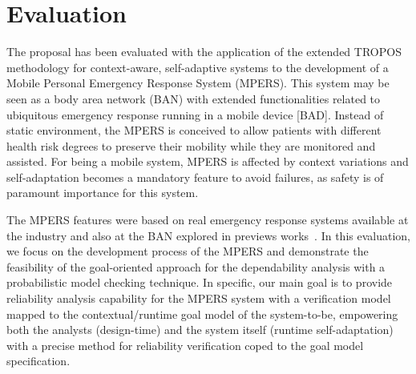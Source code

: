 


\section{Evaluation}

The proposal has been evaluated with the application of the extended TROPOS methodology for context-aware, self-adaptive systems to the development of a Mobile Personal Emergency Response System (MPERS). This system may be seen as a body area network (BAN) with extended functionalities related to ubiquitous emergency response running in a mobile device [BAD]. Instead of static environment, the MPERS is conceived to allow patients with different health risk degrees to preserve their mobility while they are monitored and assisted. For being a mobile system, MPERS is affected by context variations and self-adaptation becomes a mandatory feature to avoid failures, as safety is of paramount importance for this system.

The MPERS features were based on real emergency response systems available at the industry and also at the BAN explored in previews works~\cite{Lorincz2004, Nunes:2012, MPERS:GoSafe}. In this evaluation, we focus on the development process of the MPERS and demonstrate the feasibility of the goal-oriented approach for the dependability analysis with a probabilistic model checking technique. In specific, our main goal is to provide reliability analysis capability for the MPERS system with a verification model mapped to the contextual/runtime goal model of the system-to-be, empowering both the analysts (design-time) and the system itself (runtime self-adaptation) with a precise method for reliability verification coped to the goal model specification.

